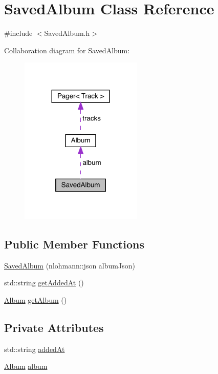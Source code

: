 \hypertarget{class_saved_album}{}\section{Saved\+Album Class Reference}
\label{class_saved_album}


{\ttfamily \#include $<$Saved\+Album.\+h$>$}



Collaboration diagram for Saved\+Album\+:
\nopagebreak
\begin{figure}[H]
\begin{center}
\leavevmode
\includegraphics[width=164pt]{class_saved_album__coll__graph}
\end{center}
\end{figure}
\subsection*{Public Member Functions}
\begin{DoxyCompactItemize}
\item 
\mbox{\hyperlink{class_saved_album_a4bd0345472be84b862018e266f56ed7c}{Saved\+Album}} (nlohmann\+::json album\+Json)
\item 
std\+::string \mbox{\hyperlink{class_saved_album_aa8fc786f49a4a40aa970b0abb15564ba}{get\+Added\+At}} ()
\item 
\mbox{\hyperlink{class_album}{Album}} \mbox{\hyperlink{class_saved_album_a10cedd17e53f2c395da2475a4005ee5a}{get\+Album}} ()
\end{DoxyCompactItemize}
\subsection*{Private Attributes}
\begin{DoxyCompactItemize}
\item 
std\+::string \mbox{\hyperlink{class_saved_album_a53127fe89be1eb579270e0474d31f48b}{added\+At}}
\item 
\mbox{\hyperlink{class_album}{Album}} \mbox{\hyperlink{class_saved_album_aee563ebdf3372113724804230bab8cdb}{album}}
\end{DoxyCompactItemize}


